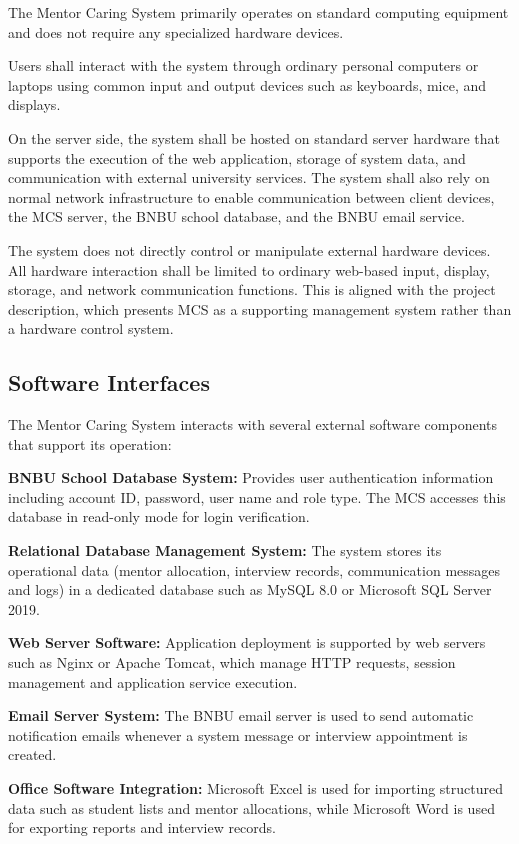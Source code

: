 \documentclass[a4paper,12pt]{article}
\begin{document}
The Mentor Caring System primarily operates on standard computing equipment and does not require any specialized hardware devices.

Users shall interact with the system through ordinary personal computers or laptops using common input and output devices such as keyboards, mice, and displays.

On the server side, the system shall be hosted on standard server hardware that supports the execution of the web application, storage of system data, and communication with external university services. The system shall also rely on normal network infrastructure to enable communication between client devices, the MCS server, the BNBU school database, and the BNBU email service.

The system does not directly control or manipulate external hardware devices. All hardware interaction shall be limited to ordinary web-based input, display, storage, and network communication functions. This is aligned with the project description, which presents MCS as a supporting management system rather than a hardware control system.

\subsection{Software Interfaces}

The Mentor Caring System interacts with several external software components that support its operation:

\textbf{BNBU School Database System:} Provides user authentication information including account ID, password, user name and role type. The MCS accesses this database in read-only mode for login verification.

\textbf{Relational Database Management System:} The system stores its operational data (mentor allocation, interview records, communication messages and logs) in a dedicated database such as MySQL 8.0 or Microsoft SQL Server 2019.

\textbf{Web Server Software:} Application deployment is supported by web servers such as Nginx or Apache Tomcat, which manage HTTP requests, session management and application service execution.

\textbf{Email Server System:} The BNBU email server is used to send automatic notification emails whenever a system message or interview appointment is created.

\textbf{Office Software Integration:} Microsoft Excel is used for importing structured data such as student lists and mentor allocations, while Microsoft Word is used for exporting reports and interview records.
\end{document}
